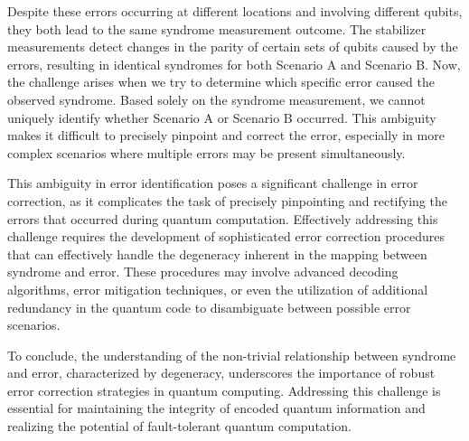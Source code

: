 \documentclass[12pt]{report}
\begin{document}
	\begin{minipage}{1 \textwidth}
		
		Despite these errors occurring at different locations and involving different qubits, they both lead to the same syndrome measurement outcome. The stabilizer measurements detect changes in the parity of certain sets of qubits caused by the errors, resulting in identical syndromes for both Scenario A and Scenario B.
		Now, the challenge arises when we try to determine which specific error caused the observed syndrome. Based solely on the syndrome measurement, we cannot uniquely identify whether Scenario A or Scenario B occurred. This ambiguity makes it difficult to precisely pinpoint and correct the error, especially in more complex scenarios where multiple errors may be present simultaneously.
		\newline
		
		This ambiguity in error identification poses a significant challenge in error correction, as it complicates the task of precisely pinpointing and rectifying the errors that occurred during quantum computation. Effectively addressing this challenge requires the development of sophisticated error correction procedures that can effectively handle the degeneracy inherent in the mapping between syndrome and error. These procedures may involve advanced decoding algorithms, error mitigation techniques, or even the utilization of additional redundancy in the quantum code to disambiguate between possible error scenarios. \newline
		
		To conclude, the understanding of the non-trivial relationship between syndrome and error, characterized by degeneracy, underscores the importance of robust error correction strategies in quantum computing. Addressing this challenge is essential for maintaining the integrity of encoded quantum information and realizing the potential of fault-tolerant quantum computation. \newline
		
	\end{minipage}
	
	\begin{minipage}{1 \textwidth}
		
	\end{minipage}
	
	
	
	\begin{minipage}{1 \textwidth}
		
	\end{minipage}
	
\end{document}

